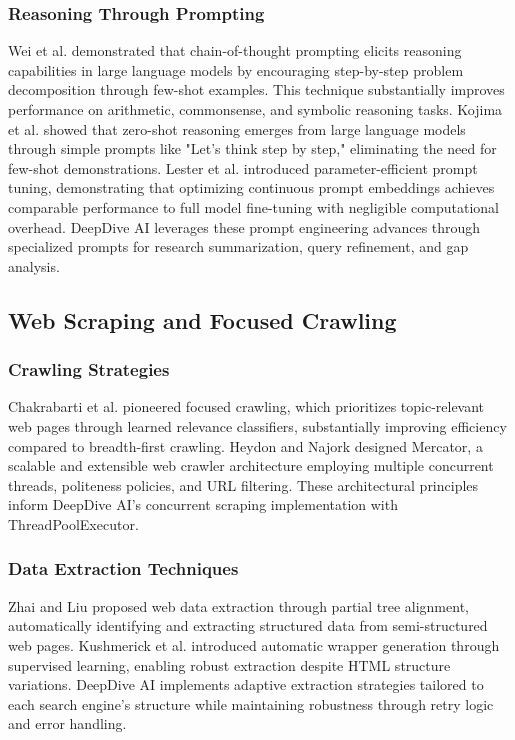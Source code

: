 \documentclass[conference]{IEEEtran}
\begin{document}
\subsubsection{Reasoning Through Prompting}
Wei et al. \cite{ref28} demonstrated that chain-of-thought prompting elicits reasoning capabilities in large language models by encouraging step-by-step problem decomposition through few-shot examples. This technique substantially improves performance on arithmetic, commonsense, and symbolic reasoning tasks. Kojima et al. \cite{ref29} showed that zero-shot reasoning emerges from large language models through simple prompts like "Let's think step by step," eliminating the need for few-shot demonstrations. Lester et al. \cite{ref30} introduced parameter-efficient prompt tuning, demonstrating that optimizing continuous prompt embeddings achieves comparable performance to full model fine-tuning with negligible computational overhead. DeepDive AI leverages these prompt engineering advances through specialized prompts for research summarization, query refinement, and gap analysis.

\subsection{Web Scraping and Focused Crawling}

\subsubsection{Crawling Strategies}
Chakrabarti et al. \cite{ref4} pioneered focused crawling, which prioritizes topic-relevant web pages through learned relevance classifiers, substantially improving efficiency compared to breadth-first crawling. Heydon and Najork \cite{ref31} designed Mercator, a scalable and extensible web crawler architecture employing multiple concurrent threads, politeness policies, and URL filtering. These architectural principles inform DeepDive AI's concurrent scraping implementation with ThreadPoolExecutor.

\subsubsection{Data Extraction Techniques}
Zhai and Liu \cite{ref8} proposed web data extraction through partial tree alignment, automatically identifying and extracting structured data from semi-structured web pages. Kushmerick et al. \cite{ref32} introduced automatic wrapper generation through supervised learning, enabling robust extraction despite HTML structure variations. DeepDive AI implements adaptive extraction strategies tailored to each search engine's structure while maintaining robustness through retry logic and error handling.
\end{document}
